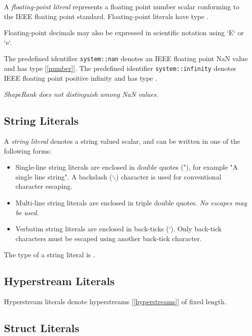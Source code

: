 \documentclass{article}
\begin{document}
A {\em floating-point literal} represents a floating point number scalar conforming to the IEEE floating point standard. Floating-point literals have type \FLOAT{}.

Floating-point decimals may also be expressed in scientific notation using `E` or `e`.

The predefined identifier {\tt system::nan}  denotes an IEEE floating point NaN value and has type \FLOAT{} 
[\ref{number}].
The predefined identifier {\tt system::infinity} denotes IEEE floating point positive infinity and has type \FLOAT{}.

{\em
ShapeRank does not distinguish among NaN values.
}


\subsection{String Literals}
\label{stringLiterals}

A {\em string literal} denotes a string valued scalar, and can be written in one of the following forms:

\StringLiteral{}

\begin{itemize}
\item
Single-line string literals are enclosed in double quotes (\textsf{"}), for example \textsf{"}A single line string\textsf{"}. A backslash ($\backslash$) character is used for conventional character escaping.
\item Multi-line string literals are enclosed in triple double quotes.  {\em No escapes may be used.}
\item Verbatim string literals are enclosed in back-ticks (`). Only back-tick characters must be escaped using another back-tick character.
\end{itemize}

The type of a string literal is \STRING.

\subsection{Hyperstream Literals}
\label{hyperstreamLiterals}

\HyperstreamLiteral

Hyperstream literals denote hyperstreams [\ref{hyperstreams}] of fixed length. 


\subsection{Struct Literals}
\label{structLiterals}
\end{document}
